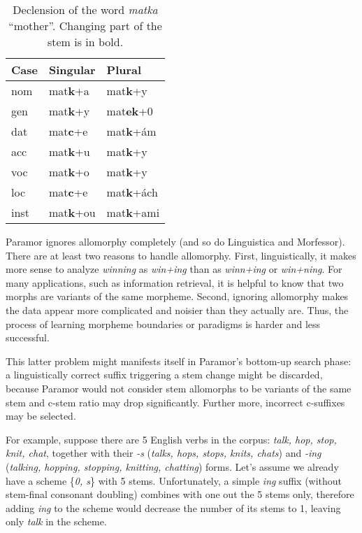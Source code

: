 \documentclass{itatnew}
\newcommand{\gloss}[2]{\emph{#1} ``#2''}
\newcommand{\e}[1]{\textit{#1}} %
\begin{document}
\begin{table}[h]
\begin{center}
\begin{tabular}{|l|ll|}
\hline \bf Case & \bf Singular & \bf Plural \\ \hline
nom & mat\textbf{k}+a & mat\textbf{k}+y \\
gen & mat\textbf{k}+y & mat\textbf{ek}+0 \\
dat & mat\textbf{c}+e & mat\textbf{k}+ám\\
acc & mat\textbf{k}+u & mat\textbf{k}+y \\
voc & mat\textbf{k}+o & mat\textbf{k}+y \\
loc & mat\textbf{c}+e & mat\textbf{k}+ách \\
inst & mat\textbf{k}+ou & mat\textbf{k}+ami \\
\hline
\end{tabular}
\end{center}
\caption{\label{table:matka} Declension of the word \gloss{matka}{mother}. Changing part of the stem is in bold.}
\end{table}


Paramor ignores allomorphy completely (and so do Linguistica and Morfessor).
%
There are at least two reasons to handle allomorphy.
%
First, linguistically,
it  makes  more  sense  to  analyze  \e{winning}  as  \e{win+ing} than as  \e{winn+ing} or \e{win+ning}. For  many  applications, such as information retrieval, it is helpful to know that two morphs are variants of the same morpheme.
%
Second, ignoring allomorphy makes the data appear more complicated and noisier than they actually are. Thus, the process of learning morpheme boundaries or paradigms is harder and less successful.

This latter problem might manifests itself in Paramor's bottom-up search phase: a linguistically correct suffix triggering a stem change might be discarded, because Paramor would not consider stem allomorphs to be variants of the same stem and c-stem ratio may drop significantly. Further more, incorrect c-suffixes may be selected.

For example, suppose there are 5 English verbs in the corpus: \emph{talk, hop, stop, knit, chat}, together with their \emph{-s} (\emph{talks, hops, stops, knits, chats}) and \emph{-ing} (\emph{talking, hopping, stopping, knitting, chatting}) forms. Let's assume we already have a scheme \{\emph{0, s}\} with 5 stems. Unfortunately, a simple \emph{ing} suffix (without stem-final consonant doubling) combines with one out the 5 stems only, therefore adding \emph{ing} to the scheme would decrease the number of its stems to 1, leaving only \emph{talk} in the scheme.
\end{document}
